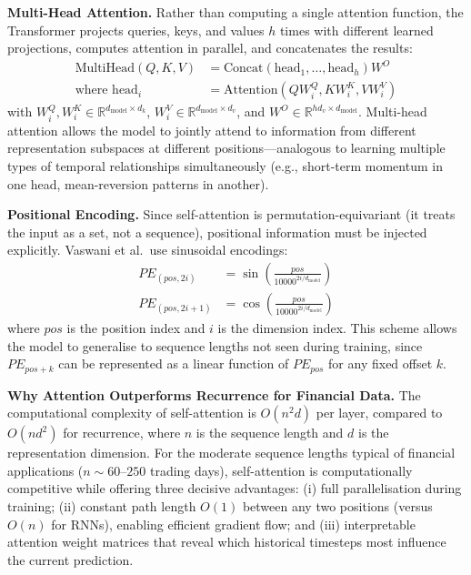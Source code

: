 \documentclass[conference]{IEEEtran}
\begin{document}
\textbf{Multi-Head Attention.} Rather than computing a single attention function, the Transformer projects queries, keys, and values $h$ times with different learned projections, computes attention in parallel, and concatenates the results:
\begin{align}
\text{MultiHead}(Q, K, V) &= \text{Concat}(\text{head}_1, \ldots, \text{head}_h) W^O \\
\text{where head}_i &= \text{Attention}(Q W_i^Q, K W_i^K, V W_i^V)
\end{align}
with $W_i^Q, W_i^K \in \mathbb{R}^{d_{\text{model}} \times d_k}$, $W_i^V \in \mathbb{R}^{d_{\text{model}} \times d_v}$, and $W^O \in \mathbb{R}^{hd_v \times d_{\text{model}}}$. Multi-head attention allows the model to jointly attend to information from different representation subspaces at different positions---analogous to learning multiple types of temporal relationships simultaneously (e.g., short-term momentum in one head, mean-reversion patterns in another).

\textbf{Positional Encoding.} Since self-attention is permutation-equivariant (it treats the input as a set, not a sequence), positional information must be injected explicitly. Vaswani et al.\ use sinusoidal encodings:
\begin{align}
PE_{(pos, 2i)} &= \sin\!\left(\frac{pos}{10000^{2i/d_{\text{model}}}}\right) \\
PE_{(pos, 2i+1)} &= \cos\!\left(\frac{pos}{10000^{2i/d_{\text{model}}}}\right)
\end{align}
where $pos$ is the position index and $i$ is the dimension index. This scheme allows the model to generalise to sequence lengths not seen during training, since $PE_{pos+k}$ can be represented as a linear function of $PE_{pos}$ for any fixed offset $k$.

\textbf{Why Attention Outperforms Recurrence for Financial Data.} The computational complexity of self-attention is $O(n^2 d)$ per layer, compared to $O(n d^2)$ for recurrence, where $n$ is the sequence length and $d$ is the representation dimension. For the moderate sequence lengths typical of financial applications ($n \sim 60$--$250$ trading days), self-attention is computationally competitive while offering three decisive advantages: (i) full parallelisation during training; (ii) constant path length $O(1)$ between any two positions (versus $O(n)$ for RNNs), enabling efficient gradient flow; and (iii) interpretable attention weight matrices that reveal which historical timesteps most influence the current prediction.
\end{document}
